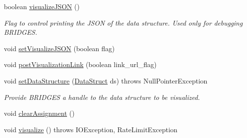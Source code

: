 \begin{DoxyCompactItemize}
boolean \hyperlink{classbridges_1_1connect_1_1_bridges_afd3c63780396e92c94c923037385b31d}{visualize\+J\+S\+ON} ()
\begin{DoxyCompactList}\small\item\em Flag to control printing the J\+S\+ON of the data structure. Used only for debugging B\+R\+I\+D\+G\+ES. \end{DoxyCompactList}\item 
void \hyperlink{classbridges_1_1connect_1_1_bridges_aa502aa32a9ac482da9c8455c6810b64d}{set\+Visualize\+J\+S\+ON} (boolean flag)
\item 
void \hyperlink{classbridges_1_1connect_1_1_bridges_a10661d820ca8c46028aa6d1eebe98a1e}{post\+Visualization\+Link} (boolean link\+\_\+url\+\_\+flag)
\item 
void \hyperlink{classbridges_1_1connect_1_1_bridges_a921a6603b2445b1abe30a1b3d6f0c255}{set\+Data\+Structure} (\hyperlink{classbridges_1_1base_1_1_data_struct}{Data\+Struct} ds)  throws Null\+Pointer\+Exception 
\begin{DoxyCompactList}\small\item\em Provide B\+R\+I\+D\+G\+ES a handle to the data structure to be visualized. \end{DoxyCompactList}\item 
void \hyperlink{classbridges_1_1connect_1_1_bridges_ad79081ca241e5bcb77b1ed52a09fdd39}{clear\+Assignment} ()
\item 
void \hyperlink{classbridges_1_1connect_1_1_bridges_a1853d64ffb8675ba2ec227a2b819cd24}{visualize} ()  throws I\+O\+Exception, Rate\+Limit\+Exception 
\end{DoxyCompactItemize}
